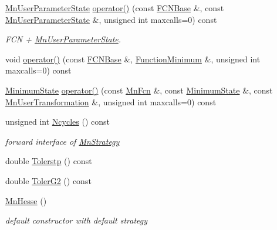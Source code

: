 \begin{DoxyCompactItemize}
\mbox{\hyperlink{classROOT_1_1Minuit2_1_1MnUserParameterState}{Mn\+User\+Parameter\+State}} \mbox{\hyperlink{classROOT_1_1Minuit2_1_1MnHesse_a4ebea568262a19a0cfec1473ce7a5f0f}{operator()}} (const \mbox{\hyperlink{classROOT_1_1Minuit2_1_1FCNBase}{F\+C\+N\+Base}} \&, const \mbox{\hyperlink{classROOT_1_1Minuit2_1_1MnUserParameterState}{Mn\+User\+Parameter\+State}} \&, unsigned int maxcalls=0) const
\begin{DoxyCompactList}\small\item\em F\+CN + \mbox{\hyperlink{classROOT_1_1Minuit2_1_1MnUserParameterState}{Mn\+User\+Parameter\+State}}. \end{DoxyCompactList}\item 
void \mbox{\hyperlink{classROOT_1_1Minuit2_1_1MnHesse_a3b6ba68a41260029bc6bde433170e600}{operator()}} (const \mbox{\hyperlink{classROOT_1_1Minuit2_1_1FCNBase}{F\+C\+N\+Base}} \&, \mbox{\hyperlink{classROOT_1_1Minuit2_1_1FunctionMinimum}{Function\+Minimum}} \&, unsigned int maxcalls=0) const
\item 
\mbox{\hyperlink{classROOT_1_1Minuit2_1_1MinimumState}{Minimum\+State}} \mbox{\hyperlink{classROOT_1_1Minuit2_1_1MnHesse_a4130de0190695811a4606f8ab229482d}{operator()}} (const \mbox{\hyperlink{classROOT_1_1Minuit2_1_1MnFcn}{Mn\+Fcn}} \&, const \mbox{\hyperlink{classROOT_1_1Minuit2_1_1MinimumState}{Minimum\+State}} \&, const \mbox{\hyperlink{classROOT_1_1Minuit2_1_1MnUserTransformation}{Mn\+User\+Transformation}} \&, unsigned int maxcalls=0) const
\item 
unsigned int \mbox{\hyperlink{classROOT_1_1Minuit2_1_1MnHesse_a5a84b9459469f2edf55f28d8d579a00d}{Ncycles}} () const
\begin{DoxyCompactList}\small\item\em forward interface of \mbox{\hyperlink{classROOT_1_1Minuit2_1_1MnStrategy}{Mn\+Strategy}} \end{DoxyCompactList}\item 
double \mbox{\hyperlink{classROOT_1_1Minuit2_1_1MnHesse_a4b36474a0d157ecb634bbf5d120db669}{Tolerstp}} () const
\item 
double \mbox{\hyperlink{classROOT_1_1Minuit2_1_1MnHesse_ae625b94360c1c974854b63aedbcc6a1a}{Toler\+G2}} () const
\item 
\mbox{\hyperlink{classROOT_1_1Minuit2_1_1MnHesse_a3be9ef44f3e8808dbd225df9a22aeab8}{Mn\+Hesse}} ()
\begin{DoxyCompactList}\small\item\em default constructor with default strategy \end{DoxyCompactList}\item 

\end{DoxyCompactItemize}
